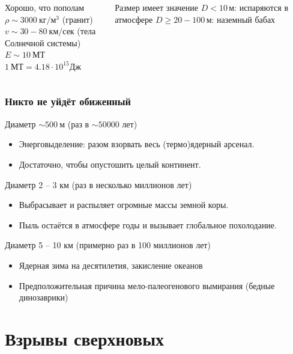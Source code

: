 \documentclass[aspectratio=169]{beamer}
\begin{document}
\begin{frame}
{\begin{columns}[c]
\begin{block}{Хорошо, что пополам}
$\rho \sim 3000 \: \mathrm{\text{кг}/\text{м}^3}$ {\small (гранит)} \\
$v \sim 30 - 80 \: \mathrm{\text{км}/\text{сек}}$ {\small (тела Солнечной системы)} \\
{\Large \color{red} $E \sim 10 \: \mathrm{\text{МТ}}$} \\
$1 \: \mathrm{\text{МТ}} = 4.18 \cdot 10^{15} \mathrm{\text{Дж}}$
\end{block}
\begin{block}{Размер имеет значение}
$D < 10 \, \mathrm{\text{м}}$: испаряются в атмосфере
$D \geq 20 - 100 \, \mathrm{\text{м}}$: наземный бабах
\end{block}
\end{columns}
}
\end{frame}

\begin{frame}
\frametitle{Никто не уйдёт обиженный}

\begin{block}{Диаметр $\sim 500 \: \mathrm{\text{м}}$ (раз в $\sim 50000$ лет)}
\begin{itemize}
\item Энерговыделение: разом взорвать весь (термо)ядерный арсенал.
\item Достаточно, чтобы опустошить целый континент.
\end{itemize}
\end{block}

\begin{block}{Диаметр 2 -- 3 км (раз в несколько миллионов лет)}
\begin{itemize}
\item Выбрасывает и распыляет огромные массы земной коры.
\item Пыль остаётся в атмосфере годы и вызывает глобальное похолодание.
\end{itemize}
\end{block}

\begin{block}{Диаметр 5 -- 10 км (примерно раз в 100 миллионов лет)}
\begin{itemize}
\item Ядерная зима на десятилетия, закисление океанов
\item Предположительная причина мело-палеогенового вымирания (бедные динозаврики)
\end{itemize}
\end{block}
\end{frame}

\section{Взрывы сверхновых}
\end{document}
